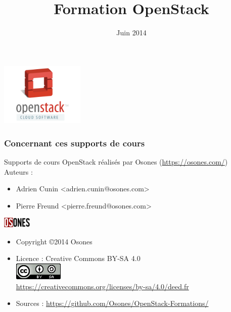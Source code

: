 \usepackage[utf8]{inputenc}
\usepackage{graphicx}
\usepackage{xparse}
\usepackage{microtype}
\usepackage{verbatim}


\title{Formation OpenStack}
\date{Juin 2014}



  \begin{frame}
    \titlepage
    \begin{center}
      \includegraphics[width=4cm]{images/openstack.png}
    \end{center}
  \end{frame}

  \begin{frame}
    \frametitle{Concernant ces supports de cours}
    Supports de cours OpenStack réalisés par Osones (\url{https://osones.com/})\\
    Auteurs :
    \begin{itemize}
      \item Adrien Cunin \textless adrien.cunin@osones.com\textgreater
      \item Pierre Freund \textless pierre.freund@osones.com\textgreater
    \end{itemize}
    \begin{center}
      \includegraphics[height=0.5cm]{images/logo-osones.png}
    \end{center}
    \begin{itemize}
      \item Copyright \copyright{2014 Osones}
      \item Licence : Creative Commons BY-SA 4.0 \\
        \includegraphics{images/licence.png} \\
        \url{https://creativecommons.org/licenses/by-sa/4.0/deed.fr}
      \item Sources : \url{https://github.com/Osones/OpenStack-Formations/}
    \end{itemize}
  \end{frame}

